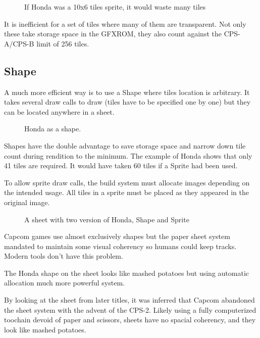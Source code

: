  \begin{figure}[H]
\caption*{If Honda was a 10x6 tiles sprite, it would waste many tiles}
\end{figure}

It is inefficient for a set of tiles where many of them are transparent. Not only these take storage space in the GFXROM, they also count against the CPS-A/CPS-B limit of 256 tiles.

\subsection{Shape}

A much more efficient way is to use a Shape where tiles location is arbitrary. It takes several draw calls to draw (tiles have to be specified one by one) but they can be located anywhere in a sheet.

 \begin{figure}[H]
\caption*{Honda as a shape.}
\end{figure}

Shapes have the double advantage to save storage space and narrow down tile count during rendition to the minimum. The example of Honda shows that only 41 tiles are required. It would have taken 60 tiles if a Sprite had been used.

To allow sprite draw calls, the build system must allocate images depending on the intended usage. All tiles in a sprite must be placed as they appeared in the original image.
 
\begin{figure}[H]
\caption*{A sheet with two version of Honda, Shape and Sprite}
\end{figure}


Capcom games use almost exclusively shapes but the paper sheet system mandated to maintain some visual coherency so humans could keep tracks. Modern tools don't have this problem. 

The Honda shape on the sheet looks like mashed potatoes but using automatic allocation much more powerful system.

By looking at the sheet from later titles, it was inferred that Capcom abandoned the sheet system with the advent of the CPS-2. Likely using a fully computerized toochain devoid of paper and scissors, sheets have no spacial coherency, and they look like mashed potatoes.


